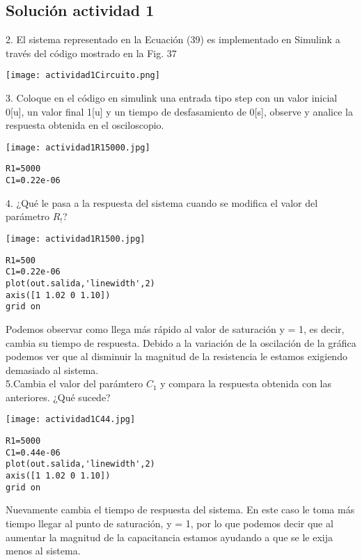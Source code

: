 \subsection{Solución actividad 1}
2. El sistema representado en la Ecuación (39) es implementado en Simulink a través del código mostrado en la Fig. 37\\

\begin{center}
\texttt{[image: actividad1Circuito.png]} 
\end{center}

3. Coloque en el código en simulink una entrada tipo step con un valor inicial 0[u], un valor final 1[u] y un tiempo de desfasamiento de 0[s], observe y analice la respuesta obtenida en el osciloscopio.\\

\begin{center}
\texttt{[image: actividad1R15000.jpg]} 
\end{center}

\begin{verbatim}
R1=5000
C1=0.22e-06
\end{verbatim}

4. ¿Qué le pasa a la respuesta del sistema cuando se modifica el valor del parámetro $R_!$?

\begin{center}
\texttt{[image: actividad1R1500.jpg]} 
\end{center}

\begin{verbatim}
R1=500
C1=0.22e-06
plot(out.salida,'linewidth',2)
axis([1 1.02 0 1.10])
grid on
\end{verbatim}

Podemos observar como llega más rápido al valor de saturación y = 1, es decir, cambia su tiempo de respuesta. Debido a la variación de la oscilación de la gráfica podemos ver que al disminuir la magnitud de la resistencia le estamos exigiendo demasiado al sistema.\\

5.Cambia el valor del parámtero $C_1$ y compara la respuesta obtenida con las anteriores. ¿Qué sucede?\\

\begin{center}
\texttt{[image: actividad1C44.jpg]} 
\end{center}

\begin{verbatim}
R1=5000
C1=0.44e-06
plot(out.salida,'linewidth',2)
axis([1 1.02 0 1.10])
grid on
\end{verbatim}

Nuevamente cambia el tiempo de respuesta del sistema. En este caso le toma más tiempo llegar al punto de saturación, y = 1, por lo que podemos decir que al aumentar la magnitud de la capacitancia estamos ayudando a que se le exija menos al sistema.\\
